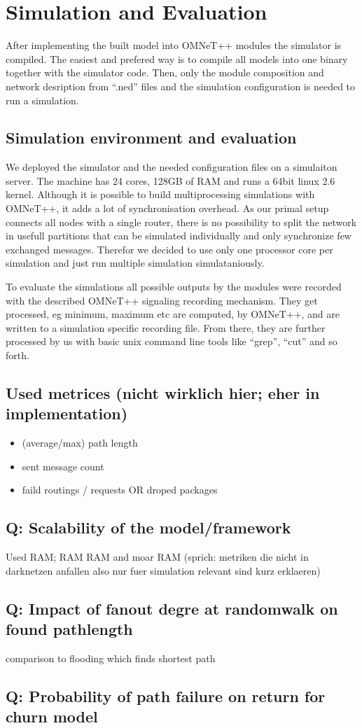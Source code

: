 \chapter{Simulation and Evaluation}

After implementing the built model into OMNeT++ modules the simulator is compiled. The easiest and prefered way is to compile all models into one binary together with the simulator code. Then, only the module composition and network desription from ``.ned'' files and the simulation configuration is needed to run a simulation.

\section{Simulation environment and evaluation}

We deployed the simulator and the needed configuration files on a simulaiton server. The machine has 24 cores, 128GB of RAM and runs a 64bit linux 2.6 kernel. Although it is possible to build multiprocessing simulations with OMNeT++, it adds a lot of synchronisation overhead. As our primal setup connects all nodes with a single router, there is no possibility to split the network in usefull partitions that can be simulated individually and only synchronize few exchanged messages. Therefor we decided to use only one processor core per simulation and just run multiple simulation simulataniously.

To evaluate the simulations all possible outputs by the modules were recorded with the described OMNeT++ signaling recording mechanism. They get processed, eg minimum, maximum etc are computed, by OMNeT++, and are written to a simulation specific recording file. From there, they are further processed by us with basic unix command line tools like ``grep'', ``cut'' and so forth.

\section{Used metrices (nicht wirklich hier; eher in implementation)}


\begin{itemize}
\item        (average/max) path length
\item        sent message count
\item        faild routings / requests OR droped packages
\end{itemize}
\section{Q: Scalability of the model/framework}
        Used RAM; RAM RAM and moar RAM (sprich: metriken die nicht in darknetzen anfallen also nur fuer simulation relevant sind kurz erklaeren)
\section{Q: Impact of fanout degre at randomwalk on found pathlength}
        comparison to flooding which finds shortest path
\section{Q: Probability of path failure on return for churn model}

